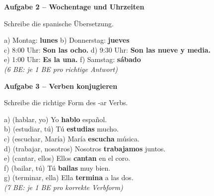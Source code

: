 \documentclass[11pt, a4paper]{article}
\newcommand{\fachfarbe}{spanisch}
\newcommand{\punktebox}[1]{\hfill\fbox{\small \_\_\_/#1}}
\newcommand{\lsg}[1]{\textcolor{loesung}{\textbf{#1}}}
\newenvironment{aufgabe}[1]{%
    \vspace{12pt}
    \noindent\textbf{\textcolor{\fachfarbe}{Aufgabe #1}}
    \vspace{6pt}
    \begin{list}{}{\leftmargin=0pt}
    \item[]
}{%
    \end{list}
}
\begin{document}

\begin{aufgabe}{2 -- Wochentage und Uhrzeiten}
Schreibe die spanische Übersetzung. \punktebox{6}
\end{aufgabe}

\noindent
a) Montag: \lsg{lunes} \hfill
b) Donnerstag: \lsg{jueves} \\[0.8em]
c) 8:00 Uhr: \lsg{Son las ocho.} \hfill
d) 9:30 Uhr: \lsg{Son las nueve y media.} \\[0.8em]
e) 1:00 Uhr: \lsg{Es la una.} \hfill
f) Samstag: \lsg{sábado} \\

\textcolor{loesung}{\textit{(6 BE: je 1 BE pro richtige Antwort)}}

\vspace{12pt}


\begin{aufgabe}{3 -- Verben konjugieren}
Schreibe die richtige Form des -ar Verbs. \punktebox{7}
\end{aufgabe}

\noindent
a) (hablar, yo) Yo \lsg{hablo} español.\\[0.7em]
b) (estudiar, tú) Tú \lsg{estudias} mucho.\\[0.7em]
c) (escuchar, María) María \lsg{escucha} música.\\[0.7em]
d) (trabajar, nosotros) Nosotros \lsg{trabajamos} juntos.\\[0.7em]
e) (cantar, ellos) Ellos \lsg{cantan} en el coro.\\[0.7em]
f) (bailar, tú) Tú \lsg{bailas} muy bien.\\[0.7em]
g) (terminar, ella) Ella \lsg{termina} a las dos.\\

\textcolor{loesung}{\textit{(7 BE: je 1 BE pro korrekte Verbform)}}

\vspace{12pt}

\end{document}

